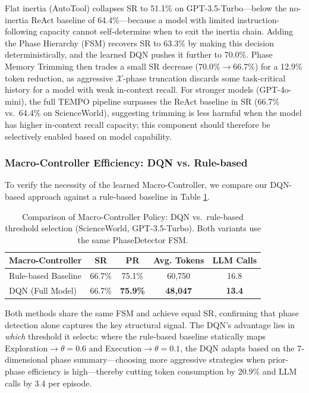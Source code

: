 \documentclass[runningheads]{llncs}
\begin{document}
Flat inertia (AutoTool) collapses SR to 51.1\% on GPT-3.5-Turbo—below the no-inertia ReAct baseline of 64.4\%—because a model with limited instruction-following capacity cannot self-determine when to exit the inertia chain. Adding the Phase Hierarchy (FSM) recovers SR to 63.3\% by making this decision deterministically, and the learned DQN pushes it further to 70.0\%. Phase Memory Trimming then trades a small SR decrease (70.0\%$\to$66.7\%) for a 12.9\% token reduction, as aggressive $\mathcal{X}$-phase truncation discards some task-critical history for a model with weak in-context recall. For stronger models (GPT-4o-mini), the full TEMPO pipeline surpasses the ReAct baseline in SR (66.7\% vs.\ 64.4\% on ScienceWorld), suggesting trimming is less harmful when the model has higher in-context recall capacity; this component should therefore be selectively enabled based on model capability.

\subsubsection{Macro-Controller Efficiency: DQN vs. Rule-based}

To verify the necessity of the learned Macro-Controller, we compare our DQN-based approach against a rule-based baseline in Table \ref{tab:rule_vs_dqn}.

\begin{table}[htb]
\centering
\small
\caption{Comparison of Macro-Controller Policy: DQN vs.\ rule-based threshold selection (ScienceWorld, GPT-3.5-Turbo). Both variants use the same PhaseDetector FSM.}
\label{tab:rule_vs_dqn}
\begin{tabular}{lcccc}
\toprule
\textbf{Macro-Controller} & \textbf{SR} & \textbf{PR} & \textbf{Avg. Tokens} & \textbf{LLM Calls} \\
\midrule
Rule-based Baseline & 66.7\% & 75.1\% & 60,750 & 16.8 \\
DQN (Full Model) & 66.7\% & \textbf{75.9\%} & \textbf{48,047} & \textbf{13.4} \\
\bottomrule
\end{tabular}
\end{table}

Both methods share the same FSM and achieve equal SR, confirming that phase detection alone captures the key structural signal. The DQN's advantage lies in \emph{which} threshold it selects: where the rule-based baseline statically maps Exploration$\to\theta{=}0.6$ and Execution$\to\theta{=}0.1$, the DQN adapts based on the 7-dimensional phase summary—choosing more aggressive strategies when prior-phase efficiency is high—thereby cutting token consumption by 20.9\% and LLM calls by 3.4 per episode.
\end{document}
